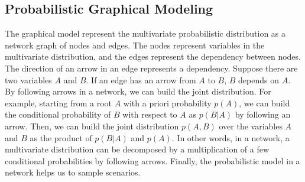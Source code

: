 \documentclass[journal]{IEEEtran} %
\begin{document}











\subsection{Probabilistic Graphical Modeling}

The  graphical model represent the multivariate probabilistic distribution as a network graph of nodes and edges. 
The nodes represent variables in the multivariate distribution, and the edges represent the dependency between nodes. The direction of an arrow in an edge represents a dependency. Suppose there are two variables $A$ and $B$. If an edge has an arrow from $A$ to $B$, $B$ depends on $A$. By following arrows in a network, we can build the joint distribution. For example, starting from a root $A$ with a priori probability $p(A)$, we can build the conditional probability of $B$ with respect to $A$ as $p(B|A)$ by following an arrow. Then, we can build the joint distribution $p(A,B)$ over the variables $A$ and $B$ as the product of $p(B|A)$ and $p(A)$. In other words, in a network, a multivariate distribution can be decomposed by a multiplication of a few conditional probabilities by following arrows. Finally, the probabilistic model in a network helps us to sample scenarios.  
\end{document}
